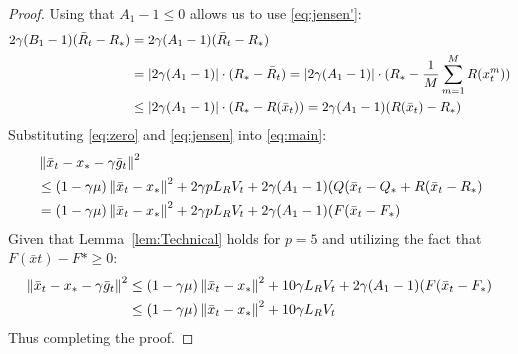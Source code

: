 \begin{proof}
    Using that $A_1 - 1 \leq 0$ allows us to use \eqref{eq:jensen'}:
    \begin{align}
        2\gamma (B_1 - 1)(\bar{R}_t - R_*) &= 2\gamma (A_1 - 1)(\bar{R}_t - R_*) \\
        &= |2\gamma (A_1 - 1)| \cdot (R_* - \bar{R}_t) = |2\gamma (A_1 - 1)| \cdot (R_* - \fsumm{m=1}{M}{R(x^m_t})) \\
        &\leq |2\gamma (A_1 - 1)| \cdot (R_* - R(\bar{x}_t)) = 2\gamma (A_1 - 1) (R(\bar{x}_t) - R_*) \label{eq:jensen}
    \end{align}
    Substituting \eqref{eq:zero} and \eqref{eq:jensen} into \eqref{eq:main}:
    \begin{align}
        &\norm{\bar{x}_t - x_* - \gamma \bar{g}_t}^2 \\
        &\leq (1 - \gamma \mu)\norm{\bar{x}_t - x_*}^2 + 2 \gamma p L_R V_t
        + 2\gamma (A_1 - 1)(Q(\bar{x}_t - Q_* + R(\bar{x}_t - R_*) \\
        &= (1 - \gamma \mu)\norm{\bar{x}_t - x_*}^2 + 2 \gamma p L_R V_t
        + 2\gamma (A_1 - 1)(F(\bar{x}_t - F_*)
    \end{align}
    Given that Lemma~\ref{lem:Technical} holds for $p = 5$ and utilizing the fact that $F(\bar{x}t) - F* \geq 0$:
    \begin{align}
        \norm{\bar{x}_t - x_* - \gamma \bar{g}_t}^2 &
        \leq (1 - \gamma \mu)\norm{\bar{x}_t - x_*}^2 + 10 \gamma L_R V_t
        + 2\gamma (A_1 - 1)(F(\bar{x}_t - F_*) \\
        &\leq (1 - \gamma \mu)\norm{\bar{x}_t - x_*}^2 + 10 \gamma L_R V_t
    \end{align}
    Thus completing the proof.
\end{proof}